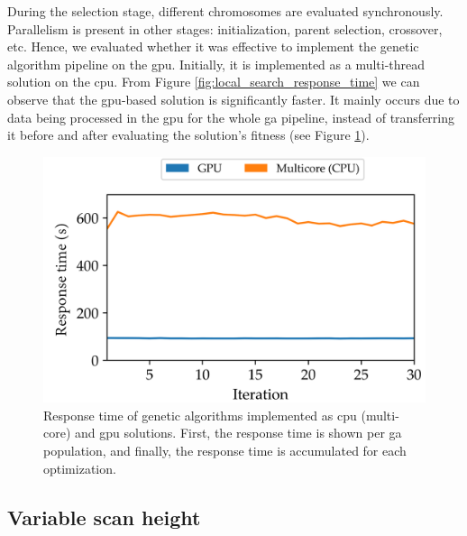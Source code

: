 During the selection stage, different chromosomes are evaluated synchronously. Parallelism is present in other stages: initialization, parent selection, crossover, etc. Hence, we evaluated whether it was effective to implement the genetic algorithm pipeline on the \acrshort{gpu}. Initially, it is implemented as a multi-thread solution on the \acrshort{cpu}. From Figure \ref{fig:local_search_response_time} we can observe that the \acrshort{gpu}-based solution is significantly faster. It mainly occurs due to data being processed in the \acrshort{gpu} for the whole \acrshort{ga} pipeline, instead of transferring it before and after evaluating the solution's fitness (see Figure \ref{fig:ga_response_time}).

\begin{figure}
    \centering
    \includegraphics[width=.65\linewidth]{figs/lidar_optimization/response_time_results_ga.png}
	\caption{Response time of genetic algorithms implemented as \acrshort{cpu} (multi-core) and \acrshort{gpu} solutions. First, the response time is shown per \acrshort{ga} population, and finally, the response time is accumulated for each optimization.}
	\label{fig:ga_response_time}
\end{figure}

\subsection{Variable scan height}

